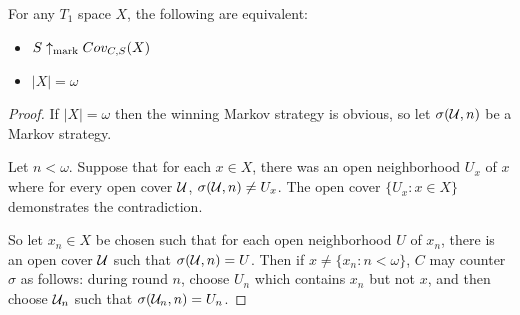 



  \begin{theorem}
  For any $T_1$ space $X$, the following are equivalent:
    \begin{itemize}
      \item $S\uparrow_{\text{mark}}Cov_{C,S}(X)$
      \item $|X|=\omega$
    \end{itemize}
  \end{theorem}

  \begin{proof}
    If $|X|=\omega$ then the winning Markov strategy is obvious, so let $\sigma(\mathcal{U},n)$ be a Markov strategy.

    Let $n<\omega$. Suppose that for each $x\in X$, there was an open neighborhood $U_x$ of $x$ where for every open cover $\mathcal{U}$, $\sigma(\mathcal{U},n) \not= U_x$. The open cover $\{U_x : x\in X\}$ demonstrates the contradiction.

    So let $x_n\in X$ be chosen such that for each open neighborhood $U$ of $x_n$, there is an open cover $\mathcal{U}$ such that $\sigma(\mathcal{U},n)=U$. Then if $x\not=\{x_n : n<\omega\}$, $C$ may counter $\sigma$ as follows: during round $n$, choose $U_n$ which contains $x_n$ but not $x$, and then choose $\mathcal{U}_n$ such that $\sigma(\mathcal{U}_n,n)=U_n$.
  \end{proof}

